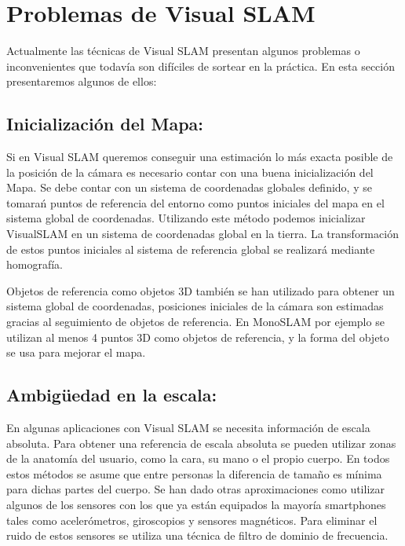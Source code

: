 \section{Problemas de Visual SLAM} \label{s:problemavlsam}

Actualmente las técnicas de Visual SLAM presentan algunos problemas o inconvenientes que todavía son difíciles de sortear en la práctica. En esta sección presentaremos algunos de ellos:

\subsection{Inicialización del Mapa:}

Si en Visual SLAM queremos conseguir una estimación lo más exacta posible de la posición de la cámara es necesario contar con una buena inicialización del Mapa. Se debe contar con un sistema de coordenadas globales definido, y se tomarań puntos de referencia del entorno como puntos iniciales del mapa en el sistema global de coordenadas. Utilizando este método podemos inicializar VisualSLAM en un sistema de coordenadas global en la tierra. La transformación de estos puntos iniciales al sistema de referencia global se realizará mediante homografía.

Objetos de referencia como objetos 3D también se han utilizado para obtener un sistema global de coordenadas, posiciones iniciales de la cámara son estimadas gracias al seguimiento de objetos de referencia.
En MonoSLAM por ejemplo se utilizan al menos 4 puntos 3D como objetos de referencia, y la forma del objeto se usa para mejorar el mapa.

\subsection{Ambigüedad en la escala:}

En algunas aplicaciones con Visual SLAM se necesita información de escala absoluta. Para obtener una referencia de escala absoluta se pueden utilizar zonas de la anatomía del usuario, como la cara, su mano o el propio cuerpo. En todos estos métodos se asume que entre personas la diferencia de tamaño es mínima para dichas partes del cuerpo. Se han dado otras aproximaciones como utilizar algunos de los sensores con los que ya están equipados la mayoría smartphones tales como acelerómetros, giroscopios y sensores magnéticos. Para eliminar el ruido de estos sensores se utiliza una técnica de filtro de dominio de frecuencia.

